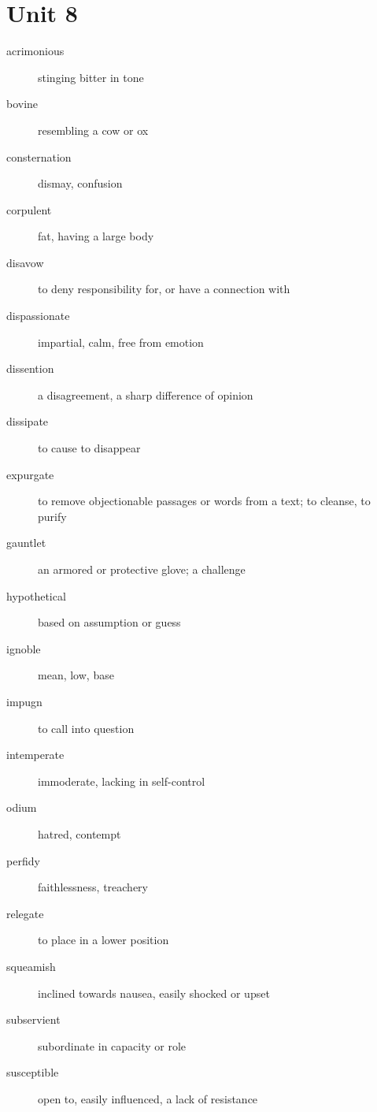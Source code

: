 \section{Unit 8}
\begin{description}
  \item[acrimonious] stinging bitter in tone
  \item[bovine] resembling a cow or ox
  \item[consternation] dismay, confusion
  \item[corpulent] fat, having a large body
  \item[disavow] to deny responsibility for, or have a connection with
  \item[dispassionate] impartial, calm, free from emotion
  \item[dissention] a disagreement, a sharp difference of opinion
  \item[dissipate] to cause to disappear
  \item[expurgate] to remove objectionable passages or words from a text; to
    cleanse, to purify
  \item[gauntlet] an armored or protective glove; a challenge
  \item[hypothetical] based on assumption or guess
  \item[ignoble] mean, low, base
  \item[impugn] to call into question
  \item[intemperate] immoderate, lacking in self-control
  \item[odium] hatred, contempt
  \item[perfidy] faithlessness, treachery
  \item[relegate] to place in a lower position
  \item[squeamish] inclined towards nausea, easily shocked or upset
  \item[subservient] subordinate in capacity or role
  \item[susceptible] open to, easily influenced, a lack of resistance
\end{description}
